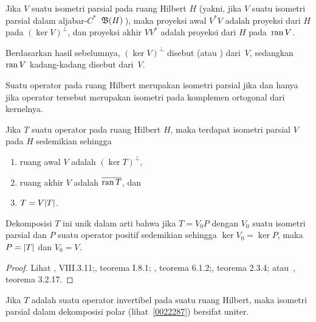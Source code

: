 \begin{prop}\label{pi0117} Jika $V$ suatu isometri parsial pada ruang Hilbert $H$ (yakni, jika $V$ suatu isometri parsial
dalam aljabar-$C^*$~$\mathfrak{B}(H)$\,), maka proyeksi awal $V^*V$ adalah
proyeksi dari $H$ pada $(\ker V)^\perp$, dan proyeksi akhir $VV^*$ adalah proyeksi
dari $H$ pada~$\operatorname{ran} V$.
\end{prop}

Berdasarkan hasil sebelumnya, $(\ker V)^\perp$ disebut
  (atau ) dari~$V$, sedangkan $\operatorname{ran} V$ kadang-kadang disebut
 dari~$V$.

\begin{prop}\label{pi0121} Suatu operator pada ruang Hilbert merupakan isometri parsial jika dan hanya jika operator tersebut merupakan
isometri pada komplemen ortogonal dari kernelnya.
\end{prop}





\begin{thm}\label{0022287} Jika $T$ suatu operator pada ruang
Hilbert $H$, maka terdapat isometri parsial $V$ pada $H$ sedemikian sehingga
 \begin{enumerate}
    \item[(i)] ruang awal $V$ adalah $(\ker T)^\perp$,
    \item[(ii)] ruang akhir $V$ adalah $\overline{\operatorname{ran} T}$, dan
    \item[(iii)] $T = V\lvert T\rvert$.
 \end{enumerate}
Dekomposisi $T$ ini unik dalam arti bahwa jika $T = V_0P$ dengan $V_0$ suatu
isometri parsial dan $P$ suatu operator positif sedemikian sehingga $\ker V_0 = \ker P$, maka $P =
\lvert T\rvert$ dan $V_0 = V$.
\end{thm}

\begin{proof} Lihat \cite{Conway:1990}, VIII.3.11;\allowbreak \cite{Davidson:1996}, teorema I.8.1;
\allowbreak \cite{KadisonR:1983}, teorema 6.1.2;\allowbreak \cite{Murphy:1990}, teorema 2.3.4;
atau~\cite{Pedersen:1995}, teorema 3.2.17. \ns
\end{proof}

\begin{cor} Jika $T$ adalah suatu
operator invertibel pada suatu ruang Hilbert, maka isometri parsial dalam dekomposisi polar
(lihat~\ref{0022287}) bersifat uniter.
\end{cor}

